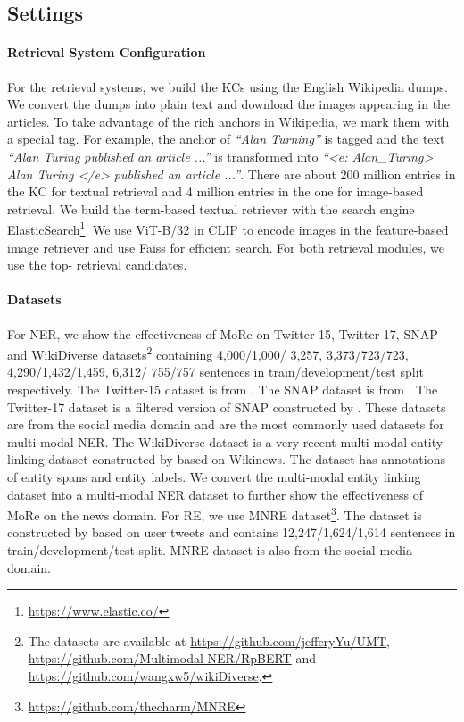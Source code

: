 \documentclass[11pt]{article}
\begin{document}
\subsection{Settings}
\paragraph{Retrieval System Configuration}
For the retrieval systems, we build the KCs using the English Wikipedia dumps. We convert the dumps into plain text and download the images appearing in the articles. To take advantage of the rich anchors in Wikipedia, we mark them with a special tag. For example, the anchor of \textit{``Alan Turning''} is tagged and the text \textit{``Alan Turing published an article ...''} is transformed into \textit{``<e: Alan\_Turing> Alan Turing </e> published an article ...''}. There are about 200 million entries in the KC for textual retrieval and 4 million entries in the one for image-based retrieval. We build the term-based textual retriever with the search engine ElasticSearch\footnote{\url{https://www.elastic.co/}}. We use ViT-B/32 in CLIP to encode images in the feature-based image retriever and use Faiss \cite{johnson2019billion} for efficient search. For both retrieval modules, we use the top- retrieval candidates.


\paragraph{Datasets}
For NER, we show the effectiveness of MoRe on Twitter-15, Twitter-17, SNAP and WikiDiverse datasets\footnote{The datasets are available at
\url{https://github.com/jefferyYu/UMT}, \url{https://github.com/Multimodal-NER/RpBERT} and \url{https://github.com/wangxw5/wikiDiverse}.} containing 4,000/1,000/ 3,257, 3,373/723/723, 4,290/1,432/1,459, 6,312/ 755/757 sentences in train/development/test split respectively. The Twitter-15 dataset is from \citet{zhang2018adaptive}. The SNAP dataset is from \citet{lu-etal-2018-visual}. The Twitter-17 dataset is a filtered version of SNAP constructed by \citet{yu-etal-2020-improving-multimodal}. These  datasets are from the social media domain and are the most commonly used datasets for multi-modal NER. The WikiDiverse dataset is a very recent multi-modal entity linking dataset constructed by \citet{wang2022wikidiverse} based on Wikinews. The dataset has annotations of entity spans and entity labels. We convert the multi-modal entity linking dataset into a multi-modal NER dataset to further show the effectiveness of MoRe on the news domain. For RE, we use MNRE dataset\footnote{\url{https://github.com/thecharm/MNRE}}. The dataset is constructed by \citet{zheng2021mnre} based on user tweets and contains 12,247/1,624/1,614 sentences in train/development/test split. MNRE dataset is also from the social media domain.
\end{document}
